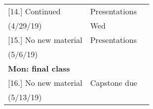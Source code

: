 \documentclass[article,oneside]{memoir}
\begin{document}
\begin{center}
\begin{longtable}{p{4.5cm}p{2.5cm}p{5cm}}
[14.] Continued 		& Presentations 			&  \\ 
(4/29/19)				   &	Wed	   	&  \\ [1.8\baselineskip]

						
[15.] 	No new material    		& 		Presentations	&   \\
(5/6/19)				      	& 			 &  \\ 
\textbf{Mon: final class}		&			&  \\ [1.8\baselineskip]

[16.] 	No new material	 	      		&  Capstone due				&   \\
(5/13/19)				      	&			      	&  \\  [1.8\baselineskip]



\end{longtable}
\end{center}





\end{document}
